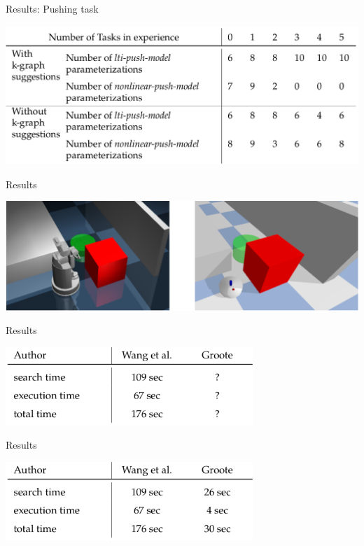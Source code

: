 \begin{frame}[fragile]{Results: Pushing task} 
\begin{center}
\includegraphics[width=1.0\textwidth]{figures/results/random_push_para}
\end{center}
\end{frame}


\begin{frame}[fragile]{Results} 
\begin{center}
 \includegraphics[width=1.0\textwidth]{figures/results/compare_sota}
\end{center}
\end{frame}


\begin{frame}[fragile]{Results} 
\begin{center}
 \includegraphics[width=0.7\textwidth]{figures/results/wang_groote_1}
\end{center}
\end{frame}

\begin{frame}[fragile]{Results} 
\begin{center}
 \includegraphics[width=0.7\textwidth]{figures/results/wang_groote_4}
\end{center}
\end{frame}





